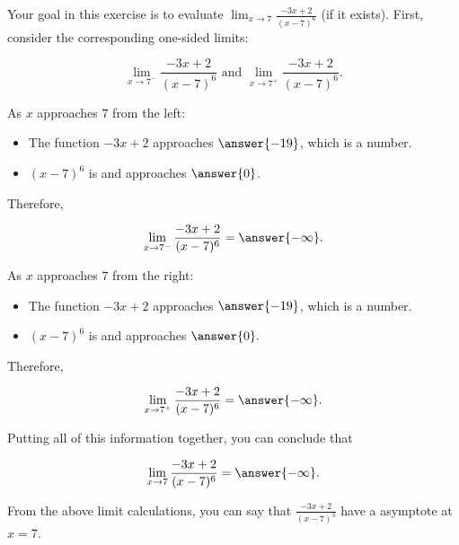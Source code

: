 \documentclass[handout]{ximera}
\begin{document}
\begin{exercise}
Your goal in this exercise is to evaluate $\displaystyle\lim_{x \to 7} \frac{-3x+2}{(x-7)^6}$ (if it exists).  First, consider the corresponding one-sided limits:

$$\displaystyle\lim_{x \to 7^-} \frac{-3x+2}{(x-7)^6} \text{ and } \displaystyle\lim_{x \to 7^+} \frac{-3x+2}{(x-7)^6}.$$

As $x$ approaches $7$ from the left:  

\begin{itemize}

\item The function $-3x+2$ approaches $\answer{-19}$, which is a  number. 

\item $(x-7)^6$ is  and approaches $\answer{0}$.

\end{itemize}

Therefore, 

 \[ \displaystyle\lim_{x \to 7^-} \frac{-3x+2}{(x-7)^6} = \answer{-\infty}.\]
 
As $x$ approaches $7$ from the right: 

\begin{itemize}

\item The function $-3x+2$ approaches $\answer{-19}$, which is a  number. 

\item $(x-7)^6$ is  and approaches $\answer{0}.$

\end{itemize}

Therefore, 

 \[ \displaystyle\lim_{x \to 7^+} \frac{-3x+2}{(x-7)^6} = \answer{-\infty}. \]

Putting all of this information together, you can conclude that

\[ \displaystyle\lim_{x \to 7} \frac{-3x+2}{(x-7)^6} = \answer{-\infty}. \]

\begin{exercise}

From the above limit calculations, you can say that $\frac{-3x+2}{(x-7)^3}$  have a  asymptote at $x =7$. 

\end{exercise}

\end{exercise}
\end{document}
